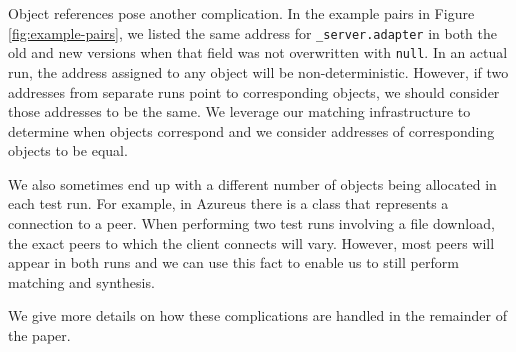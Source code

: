 Object references pose another complication.  In the example pairs in
Figure \ref{fig:example-pairs}, we listed the same address for
\texttt{\_server.adapter} in both the old and new versions when that
field was not overwritten with \texttt{null}.  In an actual run, the
address assigned to any object will be non-deterministic.  However, if
two addresses from separate runs point to corresponding objects, we
should consider those addresses to be the same.  We leverage our
matching infrastructure to determine when objects correspond and we
consider addresses of corresponding objects to be equal.

We also sometimes end up with a different number of objects being
allocated in each test run.  For example, in Azureus there is a class
that represents a connection to a peer.  When performing two test runs
involving a file download, the exact peers to which the client
connects will vary.  However, most peers will appear in both runs and
we can use this fact to enable us to still perform matching and
synthesis.

We give more details on how these complications are handled in the
remainder of the paper.

